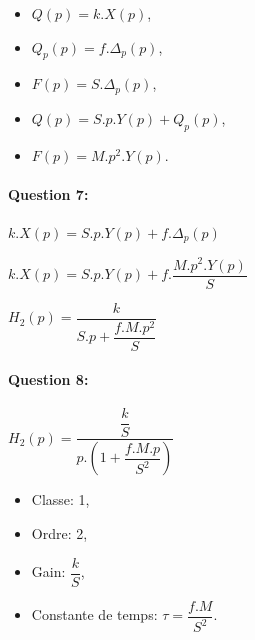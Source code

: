 \begin{itemize}
 \item $Q(p)=k.X(p)$,
 \item $Q_p(p)=f.\Delta_p(p)$,
 \item $F(p)=S.\Delta_p(p)$,
 \item $Q(p)=S.p.Y(p)+Q_p(p)$,
 \item $F(p)=M.p^2.Y(p)$.
\end{itemize}

\paragraph{Question 7:}

$k.X(p)=S.p.Y(p)+f.\Delta_p(p)$

$k.X(p)=S.p.Y(p)+f.\dfrac{M.p^2.Y(p)}{S}$

$H_2(p)=\dfrac{k}{S.p+\dfrac{f.M.p^2}{S}}$

\paragraph{Question 8:}

$H_2(p)=\dfrac{\dfrac{k}{S}}{p.\left(1+\dfrac{f.M.p}{S^2}\right)}$

\begin{itemize}
 \item Classe: 1,
 \item Ordre: 2,
 \item Gain: $\dfrac{k}{S}$,
 \item Constante de temps: $\tau=\dfrac{f.M}{S^2}$.
\end{itemize}

